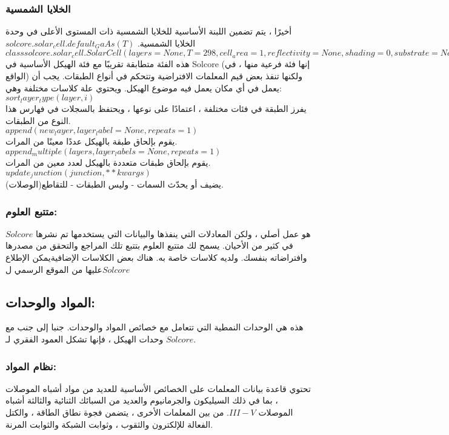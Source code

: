 \subsubsection{الخلايا الشمسية}
أخيرًا ، يتم تضمين اللبنة الأساسية للخلايا الشمسية ذات المستوى الأعلى في وحدة الخلايا الشمسية.
$ solcore.solar_cell.default_GaAs(T) $
$ class solcore.solar_cell.SolarCell(layers=None, T=298, cell_area=1, reflectivity=None, shading=0, substrate=None, incidence=None, R_series=0, **kwargs) $
هذه الفئة متطابقة تقريبًا مع فئة الهيكل الأساسية في Solcore (إنها فئة فرعية منها ، في الواقع) ولكنها تنفذ بعض قيم المعلمات الافتراضية وتتحكم في أنواع الطبقات. يجب أن يعمل في أي مكان يعمل فيه موضوع الهيكل.
ويحتوي علة كلاسات مختلفة وهي:
\\$ sort_layer_type(layer, i) $
\\يفرز الطبقة في فئات مختلفة ، اعتمادًا على نوعها ، ويحتفظ بالسجلات في فهارس هذا النوع من الطبقات.
\\$ append(new_layer, layer_label=None, repeats=1) $
\\يقوم بإلحاق طبقة بالهيكل عددًا معينًا من المرات.
\\$ append_multiple(layers, layer_labels=None, repeats=1) $
\\يقوم بإلحاق طبقات متعددة بالهيكل لعدد معين من المرات.
\\$ update_junction(junction, **kwargs) $
\\يضيف أو يحدّث السمات - وليس الطبقات - للتقاطع(الوصلات).
\subsubsection{متتبع العلوم:}
$ Solcore $ هو عمل أصلي ، ولكن المعادلات التي ينفذها والبيانات التي يستخدمها تم نشرها في كثير من الأحيان. يسمح لك متتبع العلوم بتتبع تلك المراجع والتحقق من مصدرها وافتراضاته بنفسك.
ولديه كلاسات خاصة به. هناك بعض الكلاسات الإضافيةيمكن الإطلاع عليها من الموقع الرسمي ل$ Solcore $
\subsection{المواد والوحدات: }
هذه هي الوحدات النمطية التي تتعامل مع خصائص المواد والوحدات. جنبا إلى جنب مع وحدات الهيكل ، فإنها تشكل العمود الفقري لـ $ Solcore $.
\subsubsection{نظام المواد:}
تحتوي قاعدة بيانات المعلمات على الخصائص الأساسية للعديد من مواد أشباه الموصلات ، بما في ذلك السيليكون والجرمانيوم والعديد من السبائك الثنائية والثالثة أشباه الموصلات $ III-V $. من بين المعلمات الأخرى ، يتضمن فجوة نطاق الطاقة ، والكتل الفعالة للإلكترون والثقوب ، وثوابت الشبكة والثوابت المرنة.

